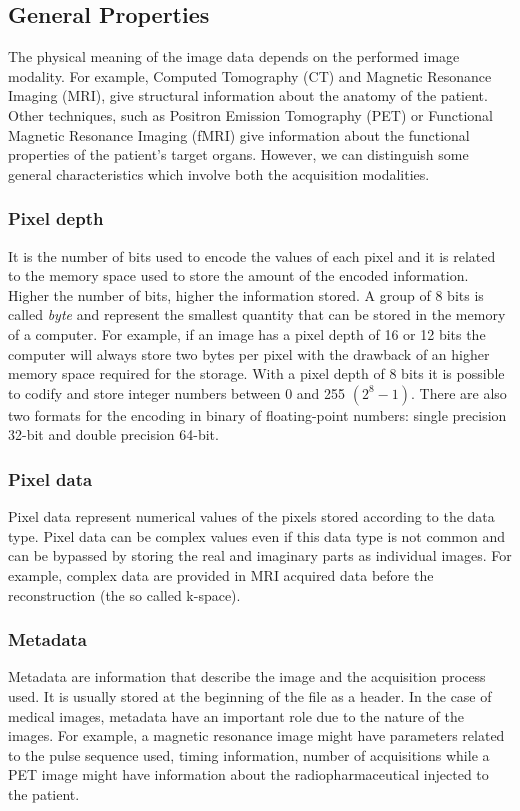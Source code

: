 \documentclass{standalone}
\begin{document}
\subsection{General Properties}
The physical meaning of the image data depends on the performed image modality.
For example, Computed Tomography (CT) and Magnetic Resonance Imaging (MRI), give structural information about the anatomy of the patient.
Other techniques, such as Positron Emission Tomography (PET) or Functional Magnetic Resonance Imaging (fMRI) give information about the functional properties of the patient's target organs. 
However, we can distinguish some general characteristics which involve both the acquisition modalities.

\subsubsection{Pixel depth} 
It is the number of bits used to encode the values of each pixel and it is related to the memory space used to store the amount of the encoded information\cite{Larobina}. 
Higher the number of bits, higher the information stored\cite{Larobina}. 
A group of 8 bits is called \textit{byte} and represent the smallest quantity that can be stored in the memory of a computer.
For example, if an image has a pixel depth of 16 or 12 bits the computer will always store two bytes per pixel with the drawback of an higher memory space required for the storage\cite{Larobina}.
With a pixel depth of 8 bits it is possible to codify and store integer numbers between 0 and 255 $(2^8-1)$.
There are also two formats for the encoding in binary of floating-point numbers: single precision 32-bit and double precision 64-bit.

\subsubsection{Pixel data} 
Pixel data represent numerical values of the pixels stored according to the data type.
Pixel data can be complex values even if this data type is not common and can be bypassed by storing the real and imaginary parts as individual images.
For example, complex data are provided in MRI acquired data before the reconstruction (the so called k-space)\cite{Larobina}.


\subsubsection{Metadata} 
Metadata are information that describe the image and the acquisition process used. It is usually stored at the beginning of the file as a header\cite{Larobina}. 
In the case of medical images, metadata have an important role due to the nature of the images.
For example, a magnetic resonance image might have parameters related to the pulse sequence used, timing information, number of acquisitions while a PET image might have information about the radiopharmaceutical injected to the patient.
\end{document}
